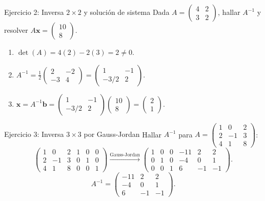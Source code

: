 \documentclass[11pt]{beamer}
\newcommand{\vv}[1]{\mathbf{#1}}
\begin{document}
\begin{frame}{Ejercicio 2: Inversa $2\times 2$ y solución de sistema}
  Dada $A = \begin{pmatrix} 4 & 2 \\ 3 & 2 \end{pmatrix}$, hallar $A^{-1}$ y resolver $A\vv{x} = \begin{pmatrix} 10 \\ 8 \end{pmatrix}$.
  \vfill
  \begin{enumerate}
    \item $\det(A) = 4(2)-2(3) = 2 \neq 0$.
    \item $A^{-1} = \frac{1}{2}\begin{pmatrix} 2 & -2 \\ -3 & 4 \end{pmatrix} = \begin{pmatrix} 1 & -1 \\ -3/2 & 2 \end{pmatrix}$.
    \item $\vv{x} = A^{-1}\vv{b} = \begin{pmatrix} 1 & -1 \\ -3/2 & 2 \end{pmatrix}\begin{pmatrix} 10 \\ 8 \end{pmatrix} = \begin{pmatrix} 2 \\ 1 \end{pmatrix}$.
  \end{enumerate}
\end{frame}

\begin{frame}{Ejercicio 3: Inversa $3\times 3$ por Gauss-Jordan}
  Hallar $A^{-1}$ para $A = \begin{pmatrix} 1 & 0 & 2 \\ 2 & -1 & 3 \\ 4 & 1 & 8 \end{pmatrix}$:
  \[
    \left(\begin{array}{ccc|ccc} 1&0&2&1&0&0 \\ 2&-1&3&0&1&0 \\ 4&1&8&0&0&1 \end{array}\right)
    \xrightarrow{\text{Gauss-Jordan}}
    \left(\begin{array}{ccc|ccc} 1&0&0&-11&2&2 \\ 0&1&0&-4&0&1 \\ 0&0&1&6&-1&-1 \end{array}\right).
  \]
  \vfill
  \[
    A^{-1} = \begin{pmatrix} -11 & 2 & 2 \\ -4 & 0 & 1 \\ 6 & -1 & -1 \end{pmatrix}.
  \]
\end{frame}
\end{document}
